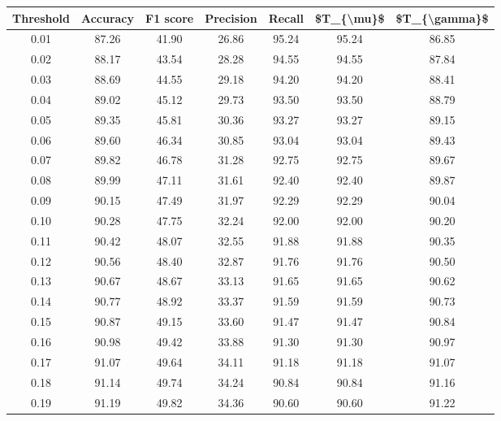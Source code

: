 \begin{tabular}{|c|c|c|c|c|c|c|}
\toprule
 Threshold &  Accuracy &  F1 score &  Precision &  Recall &  \$T\_\{\textbackslash mu\}\$ &  \$T\_\{\textbackslash gamma\}\$ \\
\hline
      0.01 &     87.26 &     41.90 &      26.86 &   95.24 &      95.24 &         86.85 \\
      0.02 &     88.17 &     43.54 &      28.28 &   94.55 &      94.55 &         87.84 \\
      0.03 &     88.69 &     44.55 &      29.18 &   94.20 &      94.20 &         88.41 \\
      0.04 &     89.02 &     45.12 &      29.73 &   93.50 &      93.50 &         88.79 \\
      0.05 &     89.35 &     45.81 &      30.36 &   93.27 &      93.27 &         89.15 \\
      0.06 &     89.60 &     46.34 &      30.85 &   93.04 &      93.04 &         89.43 \\
      0.07 &     89.82 &     46.78 &      31.28 &   92.75 &      92.75 &         89.67 \\
      0.08 &     89.99 &     47.11 &      31.61 &   92.40 &      92.40 &         89.87 \\
      0.09 &     90.15 &     47.49 &      31.97 &   92.29 &      92.29 &         90.04 \\
      0.10 &     90.28 &     47.75 &      32.24 &   92.00 &      92.00 &         90.20 \\
      0.11 &     90.42 &     48.07 &      32.55 &   91.88 &      91.88 &         90.35 \\
      0.12 &     90.56 &     48.40 &      32.87 &   91.76 &      91.76 &         90.50 \\
      0.13 &     90.67 &     48.67 &      33.13 &   91.65 &      91.65 &         90.62 \\
      0.14 &     90.77 &     48.92 &      33.37 &   91.59 &      91.59 &         90.73 \\
      0.15 &     90.87 &     49.15 &      33.60 &   91.47 &      91.47 &         90.84 \\
      0.16 &     90.98 &     49.42 &      33.88 &   91.30 &      91.30 &         90.97 \\
      0.17 &     91.07 &     49.64 &      34.11 &   91.18 &      91.18 &         91.07 \\
      0.18 &     91.14 &     49.74 &      34.24 &   90.84 &      90.84 &         91.16 \\
      0.19 &     91.19 &     49.82 &      34.36 &   90.60 &      90.60 &         91.22 \\

\end{tabular}
